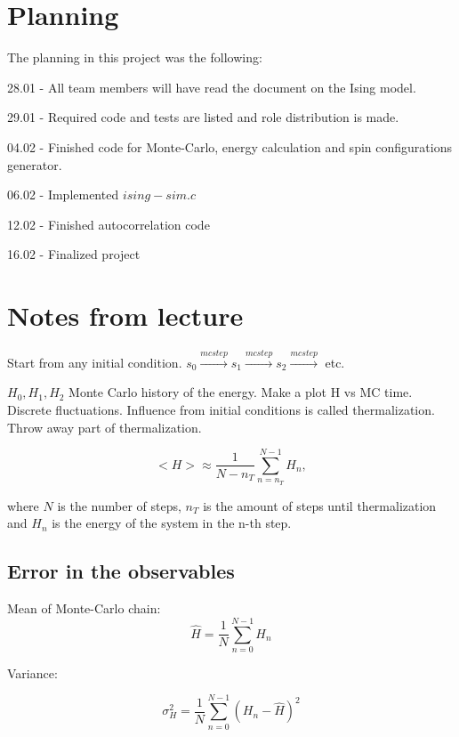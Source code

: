 \documentclass[11pt,a4paper]{article}
\begin{document}
\section{Planning}

The planning in this project was the following:

28.01 - All team members will have read the document on the Ising model.

29.01 - Required code and tests are listed and role distribution is made. 

04.02 - Finished code for Monte-Carlo, energy calculation and spin configurations generator.

06.02 - Implemented $ising-sim.c$

12.02 - Finished autocorrelation code

16.02 - Finalized project

\section{Notes from lecture}

Start from any initial condition. $s_0 \xrightarrow{mc step} s_1 \xrightarrow{mc step} s_2  \xrightarrow{mc step}$ etc.

$H_{0}, H_1 , H_2$ Monte Carlo history of the energy. Make a plot H vs MC time. Discrete fluctuations. Influence from initial conditions is called thermalization. Throw away part of thermalization. 

\begin{equation}
    <H> \approx \frac{1}{N-n_T}\sum_{n = n_T}^{N-1} H_n,
\end{equation}

where $N$ is the number of steps, $n_T$ is the amount of steps until thermalization and $H_n$ is the energy of the system in the n-th step.

\subsection{Error in the observables}


Mean of Monte-Carlo chain: 
\begin{equation}
    \hat{H} = \frac{1}{N} \sum_{n = 0}^{N-1 } H_n
\end{equation}

Variance:

\begin{equation}
    \sigma_{H}^2 = \frac{1}{N} \sum_{n = 0}^{N-1 } (H_n - \hat{H})^2
\end{equation}
\end{document}
